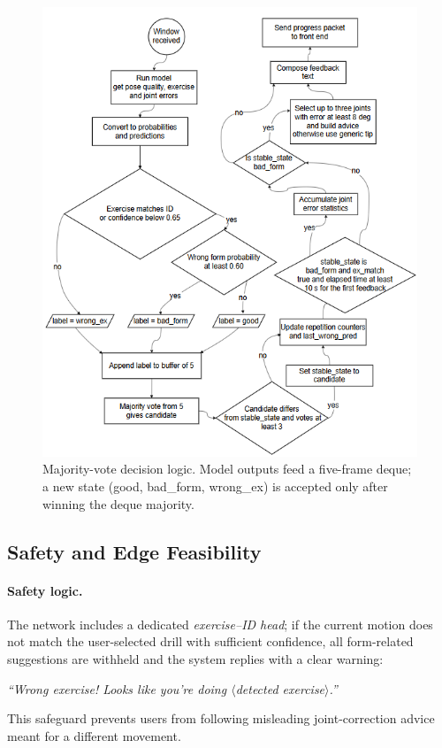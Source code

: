 \documentclass{article}
\begin{document}
\begin{figure}[H]
  \centering
  \includegraphics[width=\linewidth]{figs/flow_feedback.png}
  \caption{Majority-vote decision logic.
           Model outputs feed a five-frame deque; a new state
           (\textsf{good}, \textsf{bad\_form}, \textsf{wrong\_ex})
           is accepted only after winning the deque majority.}
  \label{fig:flow_feedback}
\end{figure}




\subsection{Safety and Edge Feasibility}

\paragraph{Safety logic.}
The network includes a dedicated \emph{exercise–ID head}; if the current
motion does not match the user-selected drill with sufficient confidence,
all form-related suggestions are withheld and the system replies with a
clear warning:  
\smallskip\centerline{\textit{“Wrong exercise! Looks like you're doing
$\langle$detected exercise$\rangle$.”}} This safeguard prevents users from following misleading joint-correction
advice meant for a different movement.
\end{document}

